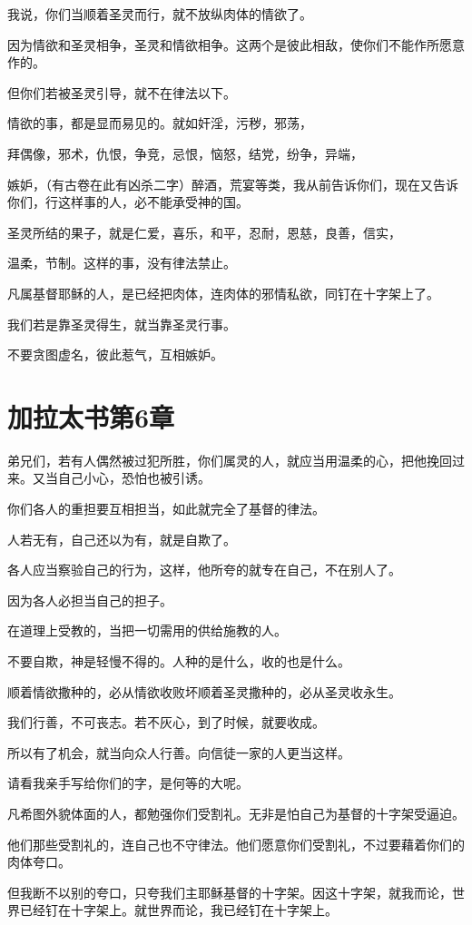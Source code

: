 \documentclass[12pt,oneside]{book}
\begin{document}
我说，你们当顺着圣灵而行，就不放纵肉体的情欲了。

因为情欲和圣灵相争，圣灵和情欲相争。这两个是彼此相敌，使你们不能作所愿意作的。

但你们若被圣灵引导，就不在律法以下。

情欲的事，都是显而易见的。就如奸淫，污秽，邪荡，

拜偶像，邪术，仇恨，争竞，忌恨，恼怒，结党，纷争，异端，

嫉妒，（有古卷在此有凶杀二字）醉酒，荒宴等类，我从前告诉你们，现在又告诉你们，行这样事的人，必不能承受神的国。

圣灵所结的果子，就是仁爱，喜乐，和平，忍耐，恩慈，良善，信实，

温柔，节制。这样的事，没有律法禁止。

凡属基督耶稣的人，是已经把肉体，连肉体的邪情私欲，同钉在十字架上了。

我们若是靠圣灵得生，就当靠圣灵行事。

不要贪图虚名，彼此惹气，互相嫉妒。

\chapter{加拉太书第6章}
弟兄们，若有人偶然被过犯所胜，你们属灵的人，就应当用温柔的心，把他挽回过来。又当自己小心，恐怕也被引诱。

你们各人的重担要互相担当，如此就完全了基督的律法。

人若无有，自己还以为有，就是自欺了。

各人应当察验自己的行为，这样，他所夸的就专在自己，不在别人了。

因为各人必担当自己的担子。

在道理上受教的，当把一切需用的供给施教的人。

不要自欺，神是轻慢不得的。人种的是什么，收的也是什么。

顺着情欲撒种的，必从情欲收败坏顺着圣灵撒种的，必从圣灵收永生。

我们行善，不可丧志。若不灰心，到了时候，就要收成。

所以有了机会，就当向众人行善。向信徒一家的人更当这样。

请看我亲手写给你们的字，是何等的大呢。

凡希图外貌体面的人，都勉强你们受割礼。无非是怕自己为基督的十字架受逼迫。

他们那些受割礼的，连自己也不守律法。他们愿意你们受割礼，不过要藉着你们的肉体夸口。

但我断不以别的夸口，只夸我们主耶稣基督的十字架。因这十字架，就我而论，世界已经钉在十字架上。就世界而论，我已经钉在十字架上。
\end{document}
